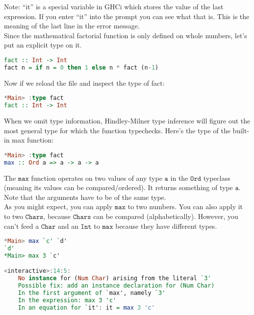 \documentclass[a4paper,12pt]{article}
\newcommand{\keywadj}[1]{\mathtt{#1}}
\begin{document}
\noindent
Note: ``it'' is a special variable in GHCi which stores the value of the last expression. If you enter ``it'' into the prompt you can see what that is. This is the meaning of the last line in the error message. \\

\noindent
Since the mathematical factorial function is only defined on whole numbers, let's put an explicit type on it.

\begin{lstlisting}[language=Haskell]
fact :: Int -> Int
fact n = if n = 0 then 1 else n * fact (n-1)
\end{lstlisting}

\noindent
Now if we reload the file and inspect the type of fact:

\begin{lstlisting}[language=Haskell]
*Main> :type fact
fact :: Int -> Int
\end{lstlisting}

\noindent
When we omit type information, Hindley-Milner type inference will figure out the most general type for which the function typechecks. Here's the type of the built-in max function:

\begin{lstlisting}[language=Haskell]
*Main> :type fact
max :: Ord a => a -> a -> a
\end{lstlisting}

\noindent
The $\keywadj{max}$ function operates on two values of any type $\keywadj{a}$ in the $\keywadj{Ord}$ typeclass (meaning its values can be compared/ordered). It returns something of type $\keywadj{a}$. Note that the arguments have to be of the same type. \\

\noindent
As you might expect, you can apply $\keywadj{max}$ to two numbers. You can also apply it to two $\keywadj{Chars}$, because $\keywadj{Chars}$ can be compared (alphabetically). However, you can't feed a $\keywadj{Char}$ and an $\keywadj{Int}$ to $\keywadj{max}$ because they have different types.

\begin{lstlisting}[language=Haskell]
*Main> max `c' `d'
`d'
*Main> max 3 `c'

<interactive>:14:5:
    No instance for (Num Char) arising from the literal `3'
    Possible fix: add an instance declaration for (Num Char)
    In the first argument of `max', namely `3'
    In the expression: max 3 'c'
    In an equation for `it': it = max 3 'c'

\end{lstlisting}
\end{document}
